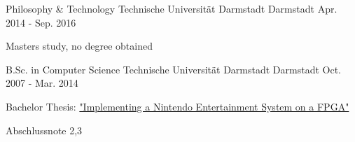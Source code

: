 
\begin{cventries}

    \cventry
    {Philosophy \& Technology} %
    {Technische Universität Darmstadt} %
    {Darmstadt} %
    {Apr. 2014 - Sep. 2016} %
    {
      \begin{cvitems} %
        \item {Masters study, no degree obtained}
      \end{cvitems}
    }


  \cventry
    {B.Sc. in Computer Science} %
    {Technische Universität Darmstadt} %
    {Darmstadt} %
    {Oct. 2007 - Mar. 2014} %
    {
      \begin{cvitems} %
        \item {Bachelor Thesis: 
          \href{https://strfry.org/assets/thesis.pdf}
          {"Implementing a Nintendo Entertainment System on a FPGA"}
        }
        \item {Abschlussnote 2,3}
      \end{cvitems}
    }


    
\end{cventries}
